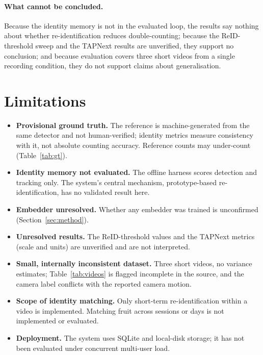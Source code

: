\documentclass[11pt]{article}
\begin{document}
\paragraph{What cannot be concluded.} Because the identity memory is not in the evaluated loop, the results say nothing about whether re-identification reduces double-counting; because the ReID-threshold sweep and the TAPNext results are unverified, they support no conclusion; and because evaluation covers three short videos from a single recording condition, they do not support claims about generalisation.

\section{Limitations}
\label{sec:limitations}

\begin{itemize}[leftmargin=*]
    \item \textbf{Provisional ground truth.} The reference is machine-generated from the same detector and not human-verified; identity metrics measure consistency with it, not absolute counting accuracy. Reference counts may under-count (Table~\ref{tab:gt}).
    \item \textbf{Identity memory not evaluated.} The offline harness scores detection and tracking only. The system's central mechanism, prototype-based re-identification, has no validated result here.
    \item \textbf{Embedder unresolved.} Whether any embedder was trained is unconfirmed (Section~\ref{sec:method}).
    \item \textbf{Unresolved results.} The ReID-threshold values and the TAPNext metrics (scale and units) are unverified and are not interpreted.
    \item \textbf{Small, internally inconsistent dataset.} Three short videos, no variance estimates; Table~\ref{tab:videos} is flagged incomplete in the source, and the camera label conflicts with the reported camera motion.
    \item \textbf{Scope of identity matching.} Only short-term re-identification within a video is implemented. Matching fruit across sessions or days is not implemented or evaluated.
    \item \textbf{Deployment.} The system uses SQLite and local-disk storage; it has not been evaluated under concurrent multi-user load.
\end{itemize}
\end{document}
